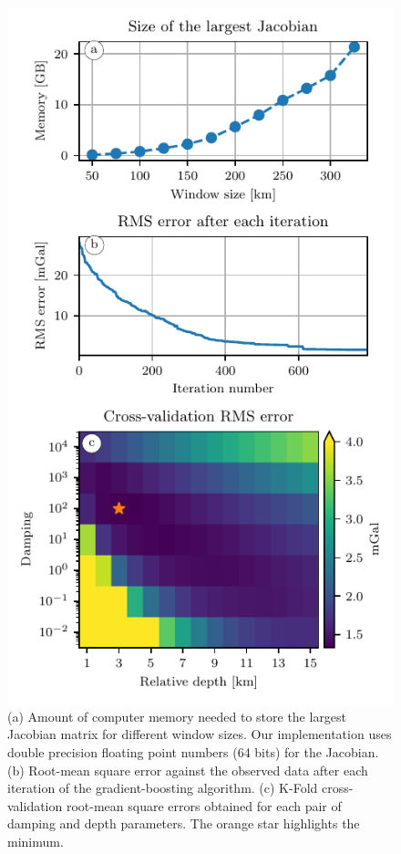 \begin{figure}[tbh!]
        \includegraphics[width=0.6\linewidth]{eql-gradient-boosted/figs/australia-memory-cv-error.pdf}
    \fi
    \makeatother
    \caption{
        (a) Amount of computer memory needed to store the largest Jacobian
        matrix for different window sizes. Our implementation uses double
        precision floating point numbers (64 bits) for the Jacobian.
        (b) Root-mean square error against the observed data after each
        iteration of the gradient-boosting algorithm.
        (c) K-Fold cross-validation root-mean square errors obtained for each
        pair of damping and depth parameters. The orange star highlights the
        minimum.
    }
    \label{fig:australia-memory-cv-error}
\end{figure}

